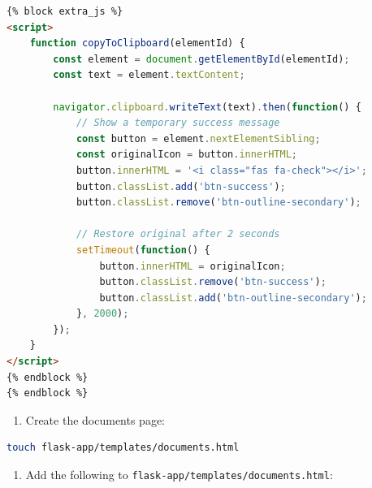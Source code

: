 \documentclass[
  screen,review,acmlarge]{acmart}
\newcommand{\passthrough}[1]{#1}
\providecommand{\tightlist}{%
  \setlength{\itemsep}{0pt}\setlength{\parskip}{0pt}}
\begin{document}
\begin{lstlisting}[language=HTML]
{% block extra_js %}
<script>
    function copyToClipboard(elementId) {
        const element = document.getElementById(elementId);
        const text = element.textContent;
        
        navigator.clipboard.writeText(text).then(function() {
            // Show a temporary success message
            const button = element.nextElementSibling;
            const originalIcon = button.innerHTML;
            button.innerHTML = '<i class="fas fa-check"></i>';
            button.classList.add('btn-success');
            button.classList.remove('btn-outline-secondary');
            
            // Restore original after 2 seconds
            setTimeout(function() {
                button.innerHTML = originalIcon;
                button.classList.remove('btn-success');
                button.classList.add('btn-outline-secondary');
            }, 2000);
        });
    }
</script>
{% endblock %}
{% endblock %}
\end{lstlisting}

\begin{enumerate}
\def\labelenumi{\arabic{enumi}.}
\setcounter{enumi}{8}
\tightlist
\item
  Create the documents page:
\end{enumerate}

\begin{lstlisting}[language=bash]
touch flask-app/templates/documents.html
\end{lstlisting}

\begin{enumerate}
\def\labelenumi{\arabic{enumi}.}
\setcounter{enumi}{9}
\tightlist
\item
  Add the following to \passthrough{\lstinline!flask-app/templates/documents.html!}:
\end{enumerate}
\end{document}
